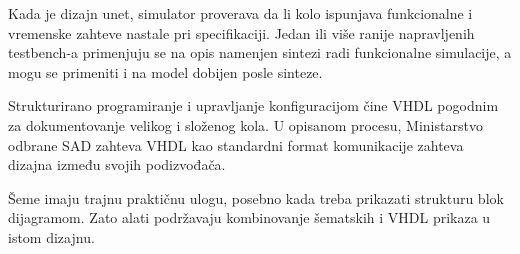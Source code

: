 Kada je dizajn unet, simulator proverava da li kolo ispunjava funkcionalne i vremenske zahteve nastale pri specifikaciji. Jedan ili više ranije napravljenih testbench-a primenjuju se na opis namenjen sintezi radi funkcionalne simulacije, a mogu se primeniti i na model dobijen posle sinteze.

Strukturirano programiranje i upravljanje konfiguracijom čine VHDL pogodnim za dokumentovanje velikog i složenog kola. U opisanom procesu, Ministarstvo odbrane SAD zahteva VHDL kao standardni format komunikacije zahteva dizajna između svojih podizvođača.

Šeme imaju trajnu praktičnu ulogu, posebno kada treba prikazati strukturu blok dijagramom. Zato alati podržavaju kombinovanje šematskih i VHDL prikaza u istom dizajnu.
